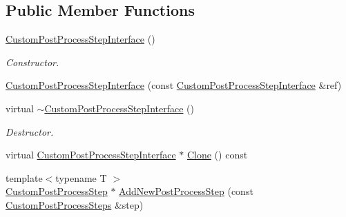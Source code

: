 \subsection*{Public Member Functions}
\begin{DoxyCompactItemize}
\item 
\mbox{\label{class_geometry_engine_1_1_custom_shading_1_1_custom_post_process_step_interface_afa53a5e09b9e76af97c22925305b833e}} 
\mbox{\hyperlink{class_geometry_engine_1_1_custom_shading_1_1_custom_post_process_step_interface_afa53a5e09b9e76af97c22925305b833e}{Custom\+Post\+Process\+Step\+Interface}} ()
\begin{DoxyCompactList}\small\item\em Constructor. \end{DoxyCompactList}\item 
\mbox{\hyperlink{class_geometry_engine_1_1_custom_shading_1_1_custom_post_process_step_interface_a0f3c8845c42763b2eab5f8620ae95545}{Custom\+Post\+Process\+Step\+Interface}} (const \mbox{\hyperlink{class_geometry_engine_1_1_custom_shading_1_1_custom_post_process_step_interface}{Custom\+Post\+Process\+Step\+Interface}} \&ref)
\item 
\mbox{\label{class_geometry_engine_1_1_custom_shading_1_1_custom_post_process_step_interface_a32c5b7e6573005e9a5d3a6ba466650f2}} 
virtual \mbox{\hyperlink{class_geometry_engine_1_1_custom_shading_1_1_custom_post_process_step_interface_a32c5b7e6573005e9a5d3a6ba466650f2}{$\sim$\+Custom\+Post\+Process\+Step\+Interface}} ()
\begin{DoxyCompactList}\small\item\em Destructor. \end{DoxyCompactList}\item 
virtual \mbox{\hyperlink{class_geometry_engine_1_1_custom_shading_1_1_custom_post_process_step_interface}{Custom\+Post\+Process\+Step\+Interface}} $\ast$ \mbox{\hyperlink{class_geometry_engine_1_1_custom_shading_1_1_custom_post_process_step_interface_a6cf76b4b01230046a84cedcac73c089e}{Clone}} () const
\item 
{\footnotesize template$<$typename T $>$ }\\\mbox{\hyperlink{class_geometry_engine_1_1_custom_shading_1_1_custom_post_process_step}{Custom\+Post\+Process\+Step}} $\ast$ \mbox{\hyperlink{class_geometry_engine_1_1_custom_shading_1_1_custom_post_process_step_interface_a7bf73f58aebc554ad16a224d1a1afcf1}{Add\+New\+Post\+Process\+Step}} (const \mbox{\hyperlink{namespace_geometry_engine_1_1_custom_shading_a09e44ca81de5fe08c6d50271d680c4b1}{Custom\+Post\+Process\+Steps}} \&step)

\end{DoxyCompactItemize}
